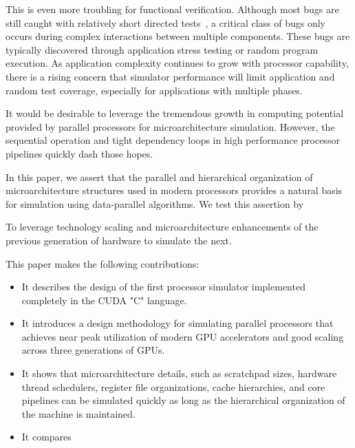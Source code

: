 \documentclass[conference, 12pt]{IEEEtran}
\begin{document}

This is even more troubling for functional verification.  Although most bugs are
still caught with relatively short directed tests~\cite{ref:bug-distributions},
a critical class of bugs only occurs during complex interactions between
multiple components.  These bugs are typically discovered through application
stress testing or random program execution.   As application complexity
continues to grow with processor capability, there is a rising concern that
simulator performance will limit application and random test coverage,
especially for applications with multiple phases.  

It would be desirable to leverage the tremendous growth in computing potential
provided by parallel processors for microarchitecture simulation.  However,
the sequential operation and tight dependency loops in high performance 
processor pipelines quickly dash those hopes.  

In this paper, we assert that the parallel and hierarchical organization of
microarchitecture structures used in modern processors provides a natural
basis for simulation using data-parallel algorithms.  We test this assertion by

To leverage technology scaling and microarchitecture enhancements of the
previous generation of hardware to simulate the next.

This paper makes the following contributions:

\begin{itemize}
	\item It describes the design of the first processor simulator implemented
		completely in the CUDA "C" language.

	\item It introduces a design methodology for simulating parallel processors
		that achieves near peak utilization of modern GPU accelerators and
		good scaling across three generations of GPUs.
		
	\item It shows that microarchitecture details, such as scratchpad sizes,
		hardware thread schedulers, register file organizations, cache
		hierarchies, and core pipelines can be simulated quickly as long as
		the hierarchical organization of the machine is maintained.
	
	\item It compares 
\end{itemize}
\end{document}
